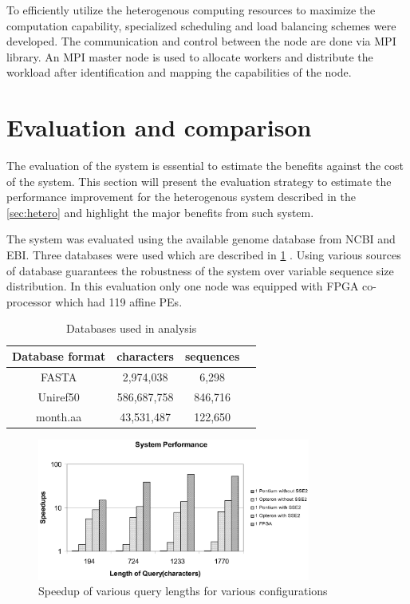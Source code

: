\documentclass[12pt,twoside]{article}
\begin{document}
To efficiently utilize the heterogenous computing resources to maximize the computation capability,
specialized scheduling and load balancing schemes were developed. The communication and control between the node are done via MPI library.
An MPI master node is used to allocate workers and distribute the workload after identification and mapping the capabilities of the node.

\section{Evaluation and comparison}
\label{sec:eval}

The evaluation of the system is essential to estimate the benefits against the cost of the system. This section will present the evaluation
strategy to estimate the performance improvement for the heterogenous system described in the \cref{sec:hetero} and highlight the major
benefits from such system.

The system was evaluated using the available genome database from NCBI and EBI. Three databases were used which are described in \cref{tab:database} \cite{meng_high-performance_2010}.
Using various sources of database guarantees
the robustness of the system over variable sequence size distribution. In this evaluation only one node was equipped with FPGA co-processor
which had 119 affine PEs.
\begin{table}
    \centering
    \begin{tabular}{ |c|c|c|c| } 
    \hline
    Database format & characters & sequences\\
    \hline
    FASTA & 2,974,038 & 6,298 \\
    \hline 
    Uniref50 & 586,687,758 & 846,716 \\ 
    \hline
    month.aa & 43,531,487 & 122,650 \\ 
    \hline
    \end{tabular}
    \caption{Databases used in analysis}
    \label{tab:database}
\end{table}

\begin{figure}[h]%
    \centering
    \includegraphics[width=0.8\textwidth]{fig/perform1}
    \caption{Speedup of various query lengths for various configurations \cite[Figure 10]{meng_high-performance_2010}}
    \label{fig:perform1}
\end{figure}
\end{document}
